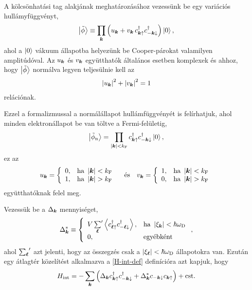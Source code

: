 \documentclass[a4paper,12pt,titlepage]{article}
\newcommand{\KK}{{\vb*{k}}}
\newcommand{\LL}{{\vb*{\ell}}}
\begin{document}
A kölcsönhatási tag alakjának meghatározásához vezessünk be egy variációs hullámyfüggvényt,
\begin{equation} \label{phi-tilde}
	\ket{\tilde{\phi}} \equiv \prod\limits_\KK \left( u_\KK + v_\KK \, c_{\KK \uparrow}^\dagger c_{-\KK \downarrow}^\dagger \right) \ket{0},
\end{equation}
ahol a $\ket{0}$ vákuum állapotba helyezünk be Cooper-párokat valamilyen amplitúdóval.  Az $u_\KK$ és $v_\KK$ együtthatók általános esetben komplexek és ahhoz, hogy $\ket{\tilde{\phi}}$ normálva legyen teljesülnie kell az
\begin{equation}
	\left| u_\KK \right|^2 + \left| v_\KK \right|^2 = 1
\end{equation}
relációnak.

Ezzel a formalizmussal a normálállapot hullámfüggvényét is felírhatjuk, ahol minden elektronállapot be van töltve a Fermi-felületig,
\begin{equation}
	\ket{\tilde{\phi}_\text{n}} = \prod\limits_{\left| \KK \right| < k_\text{F}} c_{\KK \uparrow}^\dagger c_{-\KK \downarrow}^\dagger \ket{0},
\end{equation}
ez az
\begin{equation}
	u_\KK = \left\{ \begin{array}{ll} 0, & \text{ha } \left| \KK \right| < k_\text{F} \\ 1, & \text{ha } \left| \KK \right| > k_\text{F} \end{array} \right.
	~~~ \text{és} ~~~
	v_\KK = \left\{ \begin{array}{ll} 1, & \text{ha } \left| \KK \right| < k_\text{F} \\ 0, & \text{ha } \left| \KK \right| > k_\text{F} \end{array} \right.
\end{equation}
együtthatóknak felel meg.

Vezessük be a $\Delta_\KK$ mennyiséget,
\begin{equation}
	\Delta_\KK^* \equiv \left\{ \begin{array}{ll}
	V \, {\sum\limits_\LL}^\prime \expval{c_{\LL \uparrow}^\dagger c_{-\LL \downarrow}^\dagger}, & \text{ha } \left| \xi_\KK \right| < \hbar \omega_\text{D} \\
	0, & \text{egyébként}
	\end{array} \right. ,
\end{equation}
ahol ${\sum_\LL}^\prime$ azt jelenti, hogy az összegzés csak a $\left| \xi_\LL \right| < \hbar \omega_\text{D}$ állapotokra van.  Ezután egy átlagtér közelítést alkalmazva a \eqref{H-int-def} definícióra azt kapjuk, hogy
\begin{equation}
	H_\text{int} = - \sum\limits_\KK \left( \Delta_\KK c_{\KK \uparrow}^\dagger c_{-\KK \downarrow}^\dagger + \Delta_\KK^* c_{-\KK \downarrow} c_{\KK \uparrow} \right) + \text{cst}.
\end{equation}
\end{document}
